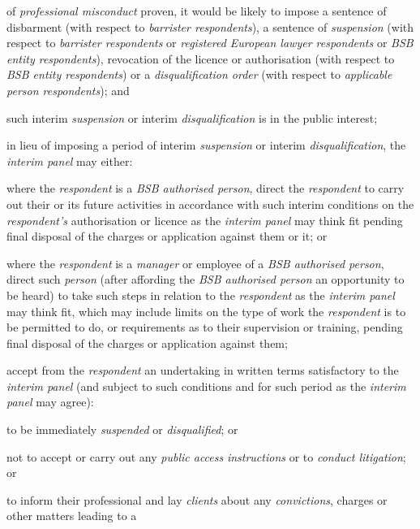 of \emph{professional misconduct} proven, it would be likely to impose a
sentence of disbarment (with respect to \emph{barrister respondents}), a
sentence of \emph{suspension} (with respect to \emph{barrister
respondents} or\emph{ registered European lawyer
respondents} or \emph{BSB entity respondents}), revocation of the
licence or authorisation (with respect to \emph{BSB entity respondents})
or a \emph{disqualification order} (with respect to \emph{applicable
person respondents}); and\item such interim \emph{suspension} or interim \emph{disqualification} is
in the public interest;\la \item in lieu of imposing a period of interim \emph{suspension} or
interim \emph{disqualification}, the \emph{interim panel} may either:\al
\item where the \emph{respondent} is a \emph{BSB authorised person}, direct
the \emph{respondent} to carry out their or its future activities in
accordance with such interim conditions on
the \emph{respondent's }authorisation or licence as the \emph{interim
panel} may think fit pending final disposal of the charges or
application against them or it; or\\
\item where the \emph{respondent }is a \emph{manager} or employee of
a \emph{BSB authorised person}, direct such \emph{person} (after
affording the \emph{BSB authorised person} an opportunity to be heard)
to take such steps in relation to the \emph{respondent }as
the \emph{interim panel} may think fit, which may include limits on the
type of work the \emph{respondent }is to be permitted to do, or
requirements as to their supervision or training, pending final disposal
of the charges or application against them;\\
\item accept from the \emph{respondent }an undertaking in written terms
satisfactory to the \emph{interim panel} (and subject to such conditions
and for such period as the \emph{interim panel} may agree):\rl
\item to be immediately \emph{suspended} or \emph{disqualified}; or\\
\item  not to accept or carry out any \emph{public
access} \emph{instructions} or to \emph{conduct litigation}; or\\
\item  to inform their professional and lay \emph{clients} about
any \emph{convictions}, charges or other matters leading to a
